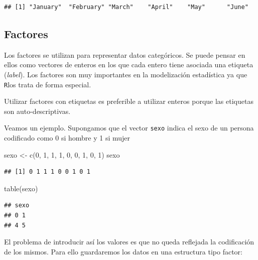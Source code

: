 \documentclass[
]{book}
\newenvironment{Shaded}{\begin{snugshade}}{\end{snugshade}}
\newcommand{\DecValTok}[1]{\textcolor[rgb]{0.00,0.00,0.81}{#1}}
\newcommand{\FunctionTok}[1]{\textcolor[rgb]{0.00,0.00,0.00}{#1}}
\newcommand{\NormalTok}[1]{#1}
\newcommand{\OtherTok}[1]{\textcolor[rgb]{0.56,0.35,0.01}{#1}}
\theoremstyle{break}
\theoremstyle{nonumberplain}
\begin{document}
\begin{verbatim}
## [1] "January"  "February" "March"    "April"    "May"      "June"
\end{verbatim}

\hypertarget{factores}{%
\subsection{Factores}\label{factores}}

Los factores se utilizan para representar datos categóricos.
Se puede pensar en ellos como vectores de enteros en los que cada entero tiene asociada una etiqueta (\emph{label}).
Los factores son muy importantes en la modelización estadística ya que \texttt{R}los trata de forma especial.

Utilizar factores con etiquetas es preferible a utilizar enteros porque las etiquetas son auto-descriptivas.

Veamos un ejemplo. Supongamos que el vector \texttt{sexo} indica el sexo de un persona codificado como 0 si hombre y 1 si mujer

\begin{Shaded}
\begin{Highlighting}[]
\NormalTok{sexo }\OtherTok{\textless{}{-}} \FunctionTok{c}\NormalTok{(}\DecValTok{0}\NormalTok{, }\DecValTok{1}\NormalTok{, }\DecValTok{1}\NormalTok{, }\DecValTok{1}\NormalTok{, }\DecValTok{0}\NormalTok{, }\DecValTok{0}\NormalTok{, }\DecValTok{1}\NormalTok{, }\DecValTok{0}\NormalTok{, }\DecValTok{1}\NormalTok{)}
\NormalTok{sexo}
\end{Highlighting}
\end{Shaded}

\begin{verbatim}
## [1] 0 1 1 1 0 0 1 0 1
\end{verbatim}

\begin{Shaded}
\begin{Highlighting}[]
\FunctionTok{table}\NormalTok{(sexo)}
\end{Highlighting}
\end{Shaded}

\begin{verbatim}
## sexo
## 0 1 
## 4 5
\end{verbatim}

El problema de introducir así los valores es que no queda reflejada la codificación de los mismos.
Para ello guardaremos los datos en una estructura tipo factor:
\end{document}
